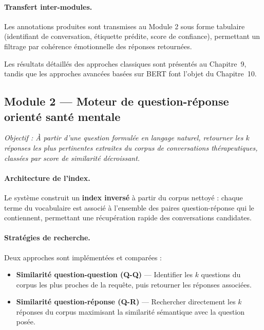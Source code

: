 \documentclass[12pt,a4paper]{report}
\begin{document}
\paragraph{Transfert inter-modules.} Les annotations produites sont transmises au Module 2 sous forme tabulaire (identifiant de conversation, étiquette prédite, score de confiance), permettant un filtrage par cohérence émotionnelle des réponses retournées.

\medskip
\begin{note}[Remarque]
Les résultats détaillés des approches classiques sont présentés au Chapitre~9, tandis que les approches avancées basées sur BERT font l'objet du Chapitre~10.
\end{note}

\subsection{Module 2 — Moteur de question-réponse orienté santé mentale}

\textit{Objectif : À partir d'une question formulée en langage naturel, retourner les $k$ réponses les plus pertinentes extraites du corpus de conversations thérapeutiques, classées par score de similarité décroissant.}

\paragraph{Architecture de l'index.} Le système construit un \textbf{index inversé} à partir du corpus nettoyé : chaque terme du vocabulaire est associé à l'ensemble des paires question-réponse qui le contiennent, permettant une récupération rapide des conversations candidates.

\paragraph{Stratégies de recherche.} Deux approches sont implémentées et comparées :

\begin{itemize}
    \item \textbf{Similarité question-question (Q-Q)} — Identifier les $k$ questions du corpus les plus proches de la requête, puis retourner les réponses associées.
    \item \textbf{Similarité question-réponse (Q-R)} — Rechercher directement les $k$ réponses du corpus maximisant la similarité sémantique avec la question posée.
\end{itemize}
\end{document}

